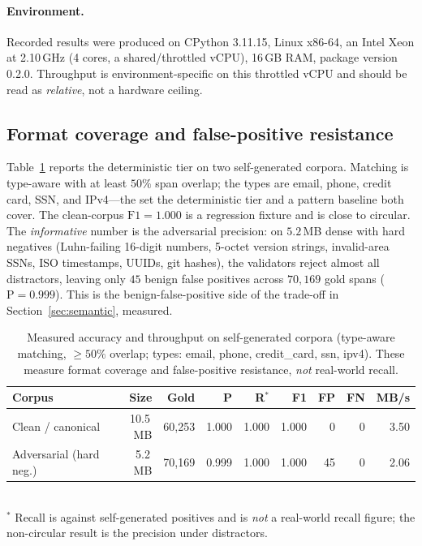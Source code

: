 \documentclass[runningheads]{llncs}
\begin{document}
\paragraph{Environment.}
Recorded results were produced on CPython 3.11.15, Linux x86-64, an Intel Xeon at
2.10\,GHz (4 cores, a shared/throttled vCPU), 16\,GB RAM, package version 0.2.0.
Throughput is environment-specific on this throttled vCPU and should be read as
\emph{relative}, not a hardware ceiling.

\subsection{Format coverage and false-positive resistance}
Table~\ref{tab:accuracy} reports the deterministic tier on two self-generated
corpora. Matching is type-aware with at least $50\%$ span overlap; the types are
email, phone, credit card, SSN, and IPv4---the set the deterministic tier and a
pattern baseline both cover. The clean-corpus $\mathrm{F1}=1.000$ is a regression
fixture and is close to circular. The \emph{informative} number is the
adversarial precision: on $5.2$\,MB dense with hard negatives (Luhn-failing
16-digit numbers, 5-octet version strings, invalid-area SSNs, ISO timestamps,
UUIDs, git hashes), the validators reject almost all distractors, leaving only
$45$ benign false positives across $70{,}169$ gold spans ($\mathrm{P}=0.999$).
This is the benign-false-positive side of the trade-off in
Section~\ref{sec:semantic}, measured.

\begin{table}[t]
\centering
\caption{Measured accuracy and throughput on self-generated corpora
(type-aware matching, $\ge 50\%$ overlap; types: email, phone, credit\_card, ssn,
ipv4). These measure format coverage and false-positive resistance, \emph{not}
real-world recall.}
\label{tab:accuracy}
\setlength{\tabcolsep}{5pt}
\begin{tabular}{@{}lrrrrrrrr@{}}
\toprule
Corpus & Size & Gold & P & R$^\ast$ & F1 & FP & FN & MB/s \\
\midrule
Clean / canonical     & 10.5\,MB & 60{,}253 & 1.000 & 1.000 & 1.000 & 0  & 0 & 3.50 \\
Adversarial (hard neg.) & 5.2\,MB  & 70{,}169 & 0.999 & 1.000 & 1.000 & 45 & 0 & 2.06 \\
\bottomrule
\end{tabular}
\\[2pt]
{\footnotesize $^\ast$ Recall is against self-generated positives and is
\emph{not} a real-world recall figure; the non-circular result is the precision
under distractors.}
\end{table}
\end{document}
